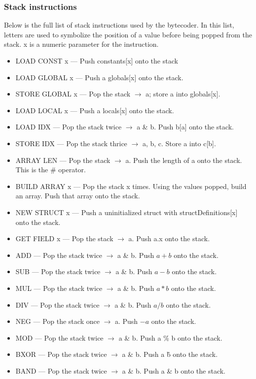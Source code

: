 \documentclass[12pt, letterpaper, oneside]{article}
\begin{document}
	\subsubsection{Stack instructions}
	Below is the full list of stack instructions used by the bytecoder.
	In this list, letters are used to symbolize the position of a value before being popped from the stack. x is a numeric parameter for the instruction.
	\begin{itemize}
		\item LOAD CONST x --- Push constants[x] onto the stack
		\item LOAD GLOBAL x --- Push a globals[x] onto the stack.
		\item STORE GLOBAL x --- Pop the stack $\rightarrow$ a; store a into globals[x].
		\item LOAD LOCAL x --- Push a locals[x] onto the stack.
		\item LOAD IDX --- Pop the stack twice $\rightarrow$ a \& b. Push b[a] onto the stack.
		\item STORE IDX --- Pop the stack thrice $\rightarrow$ a, b, c. Store a into c[b].
		\item ARRAY LEN --- Pop the stack $\rightarrow$ a. Push the length of a onto the stack. This is the \# operator.
		\item BUILD ARRAY x --- Pop the stack x times. Using the values popped, build an array. Push that array onto the stack.
		\item NEW STRUCT x --- Push a uninitialized struct with structDefinitions[x] onto the stack.
		\item GET FIELD x --- Pop the stack $\rightarrow$ a. Push a.x onto the stack.
		\item ADD --- Pop the stack twice $\rightarrow$ a \& b. Push $a+b$ onto the stack.
		\item SUB --- Pop the stack twice $\rightarrow$ a \& b. Push $a-b$ onto the stack.
		\item MUL --- Pop the stack twice $\rightarrow$ a \& b. Push $a*b$ onto the stack.
		\item DIV --- Pop the stack twice $\rightarrow$ a \& b. Push $a/b$ onto the stack.
		\item NEG --- Pop the stack once $\rightarrow$ a. Push $-a$ onto the stack.
		\item MOD --- Pop the stack twice $\rightarrow$ a \& b. Push a \% b onto the stack.
		\item BXOR --- Pop the stack twice $\rightarrow$ a \& b. Push a \^ b onto the stack.
		\item BAND --- Pop the stack twice $\rightarrow$ a \& b. Push a \& b onto the stack.

\end{itemize}
\end{document}
